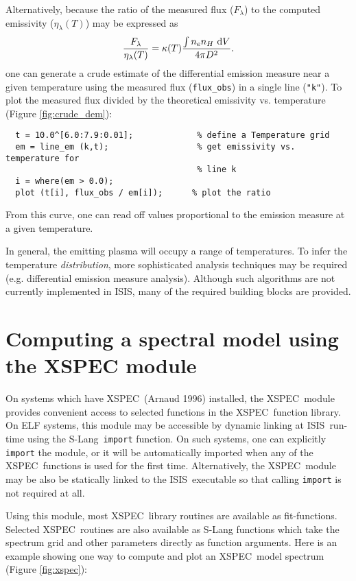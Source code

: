 \documentclass{book}
\newcommand{\D}{{\rm d}}
\newcommand{\isisx}{{\sc ISIS~}}
\newcommand{\isis}{{\sc ISIS}}
\newcommand{\slang}{{\sc S-Lang}}
\newcommand{\xspec}{{\sc XSPEC}}
\begin{document}
{Alternatively, because the ratio of the measured flux ($F_\lambda$) to the
computed emissivity ($\eta_\lambda(T)$) may be expressed as
\begin{equation}
{ F_\lambda \over \eta_\lambda(T) } = \kappa(T) { \int n_e
n_H~\D V \over 4\pi D^2 }.
\end{equation}
one can generate a crude estimate of the differential emission measure near a
given temperature using the measured flux ({\tt flux\_obs}) in a single line
({\tt "k"}). To plot the measured flux divided by the theoretical emissivity
vs. temperature (Figure \ref{fig:crude_dem}):
  \begin{verbatim}
  t = 10.0^[6.0:7.9:0.01];             % define a Temperature grid
  em = line_em (k,t);                  % get emissivity vs. temperature for
                                       % line k
  i = where(em > 0.0);
  plot (t[i], flux_obs / em[i]);      % plot the ratio
  \end{verbatim}
From this curve, one can read off values proportional to the emission
measure at a given temperature.

In general, the emitting plasma will occupy a range of temperatures.
To infer the temperature {\it distribution}, more sophisticated
analysis techniques may be required (e.g. differential emission
measure analysis). Although such algorithms are not currently
implemented in \isis, many of the required building blocks are
provided.

\section{Computing a spectral model using the XSPEC module}

On systems which have \xspec\ (Arnaud 1996) installed, the \xspec\
module provides convenient access to selected functions in the
\xspec\ function library.  On ELF systems, this module may be
accessible by dynamic linking at \isisx run-time using the \slang\
\verb|import| function. On such systems, one can explicitly
\verb|import| the module, or it will be automatically imported
when any of the \xspec\ functions is used for the first time.
Alternatively, the \xspec\ module may be also be statically linked
to the \isisx executable so that calling \verb|import| is not
required at all.

Using this module, most \xspec\ library routines are available
as fit-functions.  Selected \xspec\ routines are also available
as S-Lang functions which take the spectrum grid and other
parameters directly as function arguments. Here is an example
showing one way to compute and plot an \xspec\ model spectrum
(Figure \ref{fig:xspec}):

}
\end{document}
